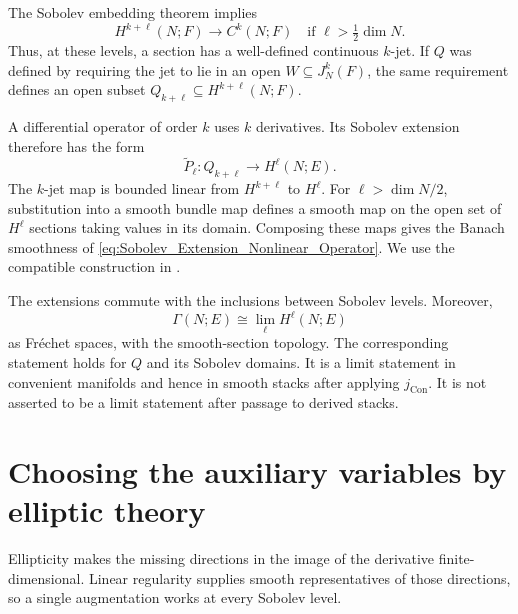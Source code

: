 The Sobolev embedding theorem implies
\[
 H^{k+\ell}(N;F)\longrightarrow C^k(N;F)
 \quad\text{if }\ell>\tfrac12\dim N.
\]
Thus, at these levels, a section has a well-defined continuous $k$-jet.
If $Q$ was defined by requiring the jet to lie in an open
$W\subseteq J_N^k(F)$, the same requirement defines an open subset
$Q_{k+\ell}\subseteq H^{k+\ell}(N;F)$.

A differential operator of order $k$ uses $k$ derivatives.
Its Sobolev extension therefore has the form
\begin{equation}\label{eq:Sobolev_Extension_Nonlinear_Operator}
 \widetilde P_\ell\colon Q_{k+\ell}\longrightarrow H^\ell(N;E).
\end{equation}
The $k$-jet map is bounded linear from $H^{k+\ell}$ to $H^\ell$.
For $\ell>\dim N/2$, substitution into a smooth bundle map defines
a smooth map on the open set of $H^\ell$ sections taking values in
its domain. Composing these maps gives the Banach smoothness of
\eqref{eq:Sobolev_Extension_Nonlinear_Operator}.
We use the compatible construction in
\cite[Lemma~3.4.5]{Steffens_Representability_Elliptic_Moduli}.

The extensions commute with the inclusions between Sobolev levels.
Moreover,
\[
 \Gamma(N;E)\cong\lim_\ell H^\ell(N;E)
\]
as Fr\'echet spaces, with the smooth-section topology.
The corresponding statement holds for $Q$ and its Sobolev domains.
It is a limit statement in convenient manifolds and hence in smooth
stacks after applying $j_{\mathrm{Con}}$.
It is not asserted to be a limit statement after passage to derived
stacks.

\section{Choosing the auxiliary variables by elliptic theory}

Ellipticity makes the missing directions in the image of the derivative
finite-dimensional. Linear regularity supplies smooth representatives
of those directions, so a single augmentation works at every Sobolev level.



